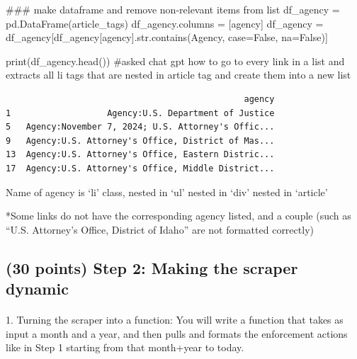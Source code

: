\documentclass[
  letterpaper,
  DIV=11,
  numbers=noendperiod]{scrartcl}
\makeatletter
\let\oldparagraph\paragraph
\renewcommand{\paragraph}{
    \@ifstar
      \xxxParagraphStar
      \xxxParagraphNoStar
  }
\newcommand{\xxxParagraphStar}[1]{\oldparagraph*{#1}\mbox{}}
\newcommand{\xxxParagraphNoStar}[1]{\oldparagraph{#1}\mbox{}}
\newenvironment{Shaded}{\begin{snugshade}}{\end{snugshade}}
\newcommand{\BuiltInTok}[1]{\textcolor[rgb]{0.00,0.23,0.31}{#1}}
\newcommand{\CommentTok}[1]{\textcolor[rgb]{0.37,0.37,0.37}{#1}}
\newcommand{\NormalTok}[1]{\textcolor[rgb]{0.00,0.23,0.31}{#1}}
\newcommand{\OperatorTok}[1]{\textcolor[rgb]{0.37,0.37,0.37}{#1}}
\newcommand{\StringTok}[1]{\textcolor[rgb]{0.13,0.47,0.30}{#1}}
\newcommand{\VariableTok}[1]{\textcolor[rgb]{0.07,0.07,0.07}{#1}}
\makeatother
\begin{document}
\begin{Shaded}
\begin{Highlighting}[]
\CommentTok{\#\#\# make dataframe and remove non{-}relevant items from list}
\NormalTok{df\_agency }\OperatorTok{=}\NormalTok{ pd.DataFrame(article\_tags)}
\NormalTok{df\_agency.columns }\OperatorTok{=}\NormalTok{ [}\StringTok{\textquotesingle{}agency\textquotesingle{}}\NormalTok{]}
\NormalTok{df\_agency }\OperatorTok{=}\NormalTok{ df\_agency[df\_agency[}\StringTok{\textquotesingle{}agency\textquotesingle{}}\NormalTok{].}\BuiltInTok{str}\NormalTok{.contains(}\StringTok{\textquotesingle{}Agency\textquotesingle{}}\NormalTok{, case}\OperatorTok{=}\VariableTok{False}\NormalTok{, na}\OperatorTok{=}\VariableTok{False}\NormalTok{)]}

\BuiltInTok{print}\NormalTok{(df\_agency.head())}
\CommentTok{\#asked chat gpt \textquotesingle{}how to go to every link in a list and extracts all \textquotesingle{}li\textquotesingle{} tags that are nested in \textquotesingle{}article\textquotesingle{} tag and create them into a new list\textquotesingle{}}
\end{Highlighting}
\end{Shaded}

\begin{verbatim}
                                               agency
1                   Agency:U.S. Department of Justice
5   Agency:November 7, 2024; U.S. Attorney's Offic...
9   Agency:U.S. Attorney's Office, District of Mas...
13  Agency:U.S. Attorney's Office, Eastern Distric...
17  Agency:U.S. Attorney's Office, Middle District...
\end{verbatim}

Name of agency is `li' class, nested in `ul' nested in `div' nested in
`article'

*Some links do not have the corresponding agency listed, and a couple
(such as ``U.S. Attorney's Office, District of Idaho'' are not formatted
correctly)

\subsection{(30 points) Step 2: Making the scraper
dynamic}\label{points-step-2-making-the-scraper-dynamic}

\paragraph{1. Turning the scraper into a function: You will write a
function that takes as input a month and a year, and then pulls and
formats the enforcement actions like in Step 1 starting from that
month+year to
today.}\label{turning-the-scraper-into-a-function-you-will-write-a-function-that-takes-as-input-a-month-and-a-year-and-then-pulls-and-formats-the-enforcement-actions-like-in-step-1-starting-from-that-monthyear-to-today.}
\end{document}
